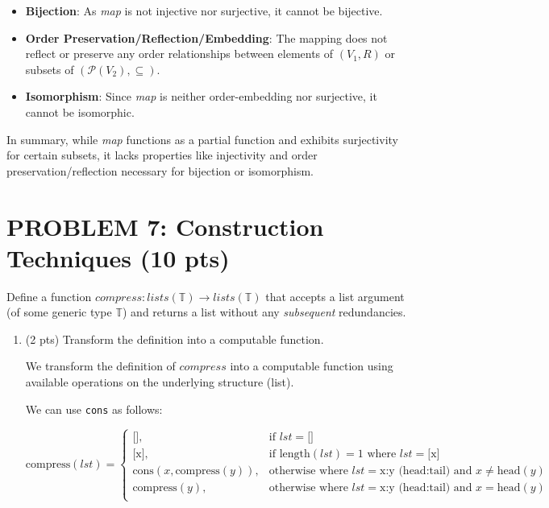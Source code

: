 \documentclass[12pt]{article}
\begin{document}
\begin{spacing}{1.5}
\begin{itemize}
		\item \textbf{Bijection}: As \textit{map} is not injective nor surjective, it cannot be bijective.
		      		      
		\item \textbf{Order Preservation/Reflection/Embedding}: The mapping does not reflect or preserve any order relationships between elements of $(V_1, R)$ or subsets of $(\mathcal{P}(V_2), \subseteq)$.
		      		      
		\item \textbf{Isomorphism}: Since \textit{map} is neither order-embedding nor surjective, it cannot be isomorphic.
	\end{itemize}
		
	\noindent In summary, while \textit{map} functions as a partial function and exhibits surjectivity for certain subsets, it lacks properties like injectivity and order preservation/reflection necessary for bijection or isomorphism.
			    
	\newpage
	\section*{PROBLEM 7: Construction Techniques (10 pts)}
		
	Define a function $compress : lists(\mathbb{T}) \rightarrow lists(\mathbb{T})$ that accepts a list argument (of some generic type $\mathbb{T}$) and returns a list without any \textit{subsequent} redundancies.
		
	\begin{enumerate}
		\item (2 pts) Transform the definition into a computable function.
		      		      
		      We transform the definition of $compress$ into a computable function using available operations on the underlying structure (list).
		      
		      We can use \texttt{cons} as follows:
		      
		      $$\text{compress}(lst) =\begin{cases}\text{[]}, & \text{if } lst = \text{[]} \\\text{[x]}, & \text{if } \text{length}(lst) = 1 \text{ where } lst = \text{[x]} \\\text{cons}(x, \text{compress}(y)), & \text{otherwise where } lst = \text{x:y} \text{ (head:tail) and } x \neq \text{head}(y) \\\text{compress}(y), & \text{otherwise where } lst = \text{x:y} \text{ (head:tail) and } x = \text{head}(y) \\\end{cases}$$
		      		

\end{enumerate}
\end{spacing}
\end{document}
